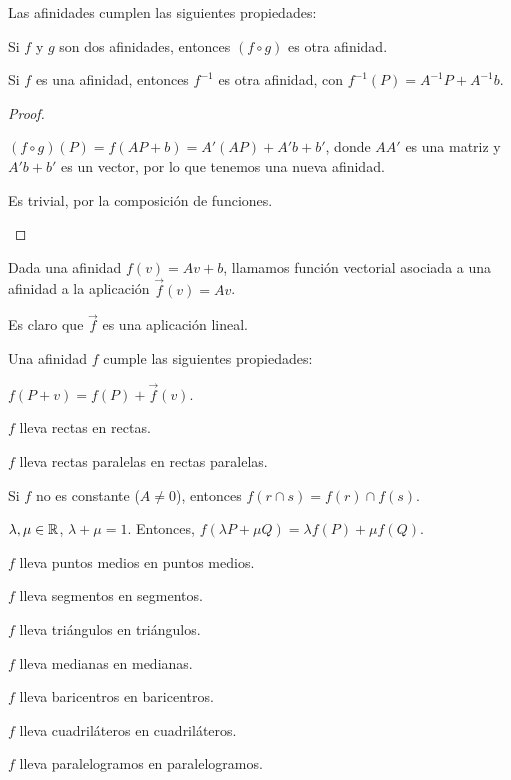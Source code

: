 \begin{nprop}
  Las afinidades cumplen las siguientes propiedades:
  \begin{nlist}
    \item Si $f$ y $g$ son dos afinidades, entonces $(f \circ g)$ es otra afinidad.
    \item Si $f$ es una afinidad, entonces  $f^{-1}$ es otra afinidad, con $f^{-1}(P) = A^{-1}P +A^{-1}b$.
  \end{nlist}
\end{nprop}
\begin{proof}\hfill
  \begin{nlist}
  \item $(f\circ g)(P) = f(AP +b) = A'(AP)+A'b +b' $, donde $AA'$ es una matriz y $A'b+b'$ es un vector, por lo que tenemos una nueva afinidad.
  \item Es trivial, por la composición de funciones.
  \end{nlist}
\end{proof}

\begin{ndef}
  Dada una afinidad $f(v) = Av + b$, llamamos función vectorial asociada a una afinidad a la aplicación $\vec{f}(v) = Av$.
\end{ndef}

\begin{nota}
	Es claro que $\vec{f}$ es una aplicación lineal.
\end{nota}

\begin{nprop}
Una afinidad $f$ cumple las siguientes propiedades:
  \begin{nlist}
    \item $f(P + v) = f(P) + \vec{f}(v)$.
\item $f$ lleva rectas en rectas.
\item $f$ lleva rectas paralelas en rectas paralelas.
\item Si $f$ no es constante ($A \ne 0$), entonces $f(r\cap s) = f(r) \cap f(s)$.
\item $\lambda,\mu \in \mathbb{R}$, $\lambda+\mu=1$. Entonces, $f(\lambda P + \mu Q) = \lambda f(P) +  \mu f(Q)$.
\item $f$ lleva puntos medios en puntos medios.
\item $f$ lleva segmentos en segmentos.
\item $f$ lleva triángulos en triángulos.
\item $f$ lleva medianas en medianas.
\item $f$ lleva baricentros en baricentros.
\item $f$ lleva cuadriláteros en cuadriláteros.
\item $f$ lleva paralelogramos en paralelogramos.
  \end{nlist}
\end{nprop}

